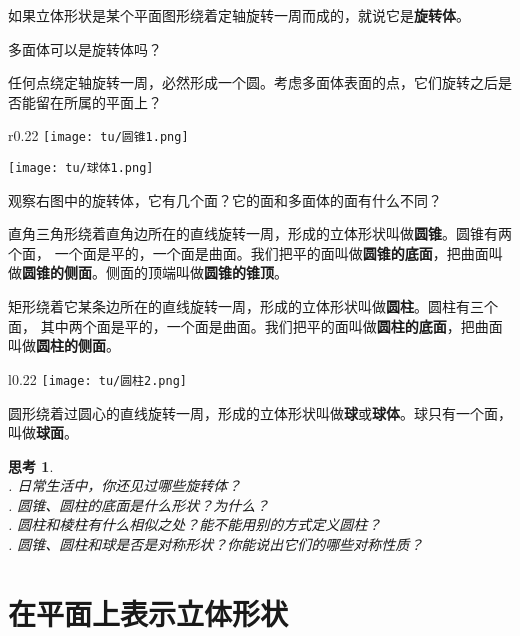 \documentclass[12pt,UTF8]{ctexbook}
\theoremstyle{definition}
\theoremstyle{plain}
\newtheorem{sk}{思考}[section]
\begin{document}
如果立体形状是某个平面图形绕着定轴旋转一周而成的，就说它是\textbf{旋转体}。

多面体可以是旋转体吗？

任何点绕定轴旋转一周，必然形成一个圆。考虑多面体表面的点，它们旋转之后是否能留在所属的平面上？

\begin{wrapfigure}[9]{r}{0.22\textwidth} %
    \vspace{-10pt}
    \flushright
    \texttt{[image: tu/圆锥1.png]}

    \vspace{20pt}
    \texttt{[image: tu/球体1.png]}
\end{wrapfigure}

观察右图中的旋转体，它有几个面？它的面和多面体的面有什么不同？

直角三角形绕着直角边所在的直线旋转一周，形成的立体形状叫做\textbf{圆锥}。圆锥有两个面，
一个面是平的，一个面是曲面。我们把平的面叫做\textbf{圆锥的底面}，把曲面叫做\textbf{圆锥的侧面}。侧面的顶端叫做\textbf{圆锥的锥顶}。

矩形绕着它某条边所在的直线旋转一周，形成的立体形状叫做\textbf{圆柱}。圆柱有三个面，
其中两个面是平的，一个面是曲面。我们把平的面叫做\textbf{圆柱的底面}，把曲面叫做\textbf{圆柱的侧面}。

\begin{wrapfigure}[6]{l}{0.22\textwidth} %
    \vspace{-16pt}
    \flushleft
    \texttt{[image: tu/圆柱2.png]}
\end{wrapfigure}

圆形绕着过圆心的直线旋转一周，形成的立体形状叫做\textbf{球}或\textbf{球体}。球只有一个面，叫做\textbf{球面}。

\begin{sk}
    \mbox{}\\
    . 日常生活中，你还见过哪些旋转体？\\
    . 圆锥、圆柱的底面是什么形状？为什么？\\
    . 圆柱和棱柱有什么相似之处？能不能用别的方式定义圆柱？\\
    . 圆锥、圆柱和球是否是对称形状？你能说出它们的哪些对称性质？
\end{sk}

\section{在平面上表示立体形状}
\end{document}
